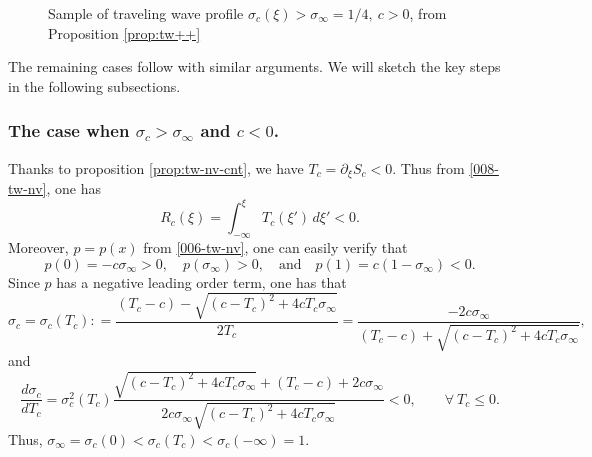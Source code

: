 \documentclass[12pt]{article}
\theoremstyle{definition}
\theoremstyle{remark}
\numberwithin{equation}{section}
\begin{document}
\begin{figure}[htbp]
\centering
{}
\caption{Sample of traveling wave profile $\sigma_c(\xi) > \sigma_\infty = 1/4, \ c > 0 $, from Proposition \ref{prop:tw++}}
\label{fig:sigma_c_tw++}
\end{figure}

The remaining cases follow with similar arguments. We will sketch the key steps in the following subsections. 

\subsubsection{The case when $ \sigma_c > \sigma_\infty $ and $ c < 0 $.} 
\label{subsubsec:+-}
Thanks to proposition \ref{prop:tw-nv-cnt}, we have $ T_c = \partial_\xi S_c < 0 $. Thus from \eqref{008-tw-nv}, one has 
\begin{equation}
    \label{201-tw-nv}
    R_c(\xi) = \int_{-\infty}^\xi T_c(\xi')\,d\xi' < 0.
\end{equation}
Moreover, $ p = p(x) $ from \eqref{006-tw-nv}, one can easily verify that
\begin{equation}
    \label{202-tw-nv}
    p(0) = - c \sigma_\infty > 0, \quad p(\sigma_\infty) > 0, \quad \text{and} \quad  p(1) = c(1-\sigma_\infty)  < 0.
\end{equation}
Since $ p $ has a negative leading order term, one has that 
\begin{equation}
    \label{203-tw-nv}
    \sigma_c = \sigma_c(T_c) : = \frac{(T_c - c) - \sqrt{(c-T_c)^2 + 4 c T_c \sigma_\infty}}{2 T_c} = \frac{-2 c \sigma_\infty}{(T_c-c) + \sqrt{(c-T_c)^2 + 4 c T_c \sigma_\infty}},
\end{equation}
and
\begin{equation}
    \label{204-tw-nv}
    \frac{d\sigma_c}{dT_c} = \sigma_c^2(T_c) \frac{ \sqrt{(c-T_c)^2 + 4c T_c \sigma_\infty} + (T_c - c) + 2 c \sigma_\infty }{2c\sigma_\infty \sqrt{(c-T_c)^2 + 4c T_c \sigma_\infty}} < 0,  \qquad \forall \ T_c \leq 0. 
\end{equation}
Thus, $ \sigma_\infty = \sigma_c(0) < \sigma_c(T_c) < \sigma_c(-\infty) = 1 $. 
\end{document}
